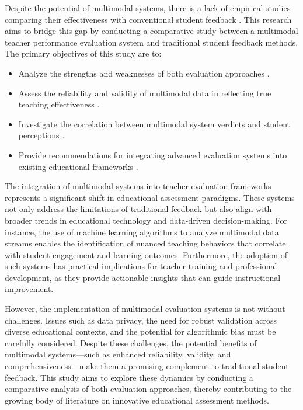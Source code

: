 Despite the potential of multimodal systems, there is a lack of empirical studies comparing their effectiveness with conventional student feedback \cite{Ginsburg2022NecessaryBI}. This research aims to bridge this gap by conducting a comparative study between a multimodal teacher performance evaluation system and traditional student feedback methods. The primary objectives of this study are to:

\begin{itemize}
    \item Analyze the strengths and weaknesses of both evaluation approaches \cite{Heffernan2022, carvalho2022biases, 10.1007/978-981-99-9109-9_7}.
    \item Assess the reliability and validity of multimodal data in reflecting true teaching effectiveness \cite{Wang2022, Yang2022, YE2023108915}.
    \item Investigate the correlation between multimodal system verdicts and student perceptions \cite{Ajmal2024, Husain2016, falcon2024discourse}.
    \item Provide recommendations for integrating advanced evaluation systems into existing educational frameworks \cite{Ginsburg2022NecessaryBI, 10.1007/978-981-99-9109-9_7, hou2024encouragement}.
\end{itemize}

The integration of multimodal systems into teacher evaluation frameworks represents a significant shift in educational assessment paradigms. These systems not only address the limitations of traditional feedback but also align with broader trends in educational technology and data-driven decision-making. For instance, the use of machine learning algorithms to analyze multimodal data streams enables the identification of nuanced teaching behaviors that correlate with student engagement and learning outcomes. Furthermore, the adoption of such systems has practical implications for teacher training and professional development, as they provide actionable insights that can guide instructional improvement.

However, the implementation of multimodal evaluation systems is not without challenges. Issues such as data privacy, the need for robust validation across diverse educational contexts, and the potential for algorithmic bias must be carefully considered. Despite these challenges, the potential benefits of multimodal systems—such as enhanced reliability, validity, and comprehensiveness—make them a promising complement to traditional student feedback. This study aims to explore these dynamics by conducting a comparative analysis of both evaluation approaches, thereby contributing to the growing body of literature on innovative educational assessment methods.

